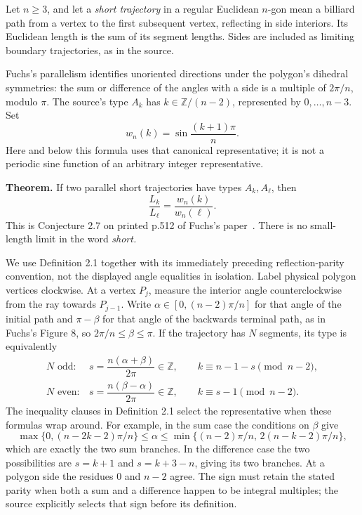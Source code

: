 \documentclass[11pt]{article}
\begin{document}
Let \(n\ge3\), and let a \emph{short trajectory} in a regular Euclidean \(n\)-gon mean a billiard path from a vertex to the first subsequent vertex, reflecting in side interiors. Its Euclidean length is the sum of its segment lengths. Sides are included as limiting boundary trajectories, as in the source.

Fuchs's parallelism identifies unoriented directions under the polygon's dihedral symmetries: the sum or difference of the angles with a side is a multiple of \(2\pi/n\), modulo \(\pi\). The source's type \(A_k\) has \(k\in\mathbb Z/(n-2)\), represented by \(0,\ldots,n-3\). Set
\[
w_n(k)=\sin\frac{(k+1)\pi}{n}.
\]
Here and below this formula uses that canonical representative; it is not a periodic sine function of an arbitrary integer representative.

\textbf{Theorem.} If two parallel short trajectories have types \(A_k,A_\ell\), then
\[
\frac{L_k}{L_\ell}=\frac{w_n(k)}{w_n(\ell)}.
\tag{1}
\]
This is Conjecture 2.7 on printed p.512 of Fuchs's paper~\cite{Fuchs}. There is no small-length limit in the word \emph{short.}

We use Definition 2.1 together with its immediately preceding reflection-parity convention, not the displayed angle equalities in isolation. Label physical polygon vertices clockwise. At a vertex \(P_j\), measure the interior angle counterclockwise from the ray towards \(P_{j-1}\). Write \(\alpha\in[0,(n-2)\pi/n]\) for that angle of the initial path and \(\pi-\beta\) for that angle of the backwards terminal path, as in Fuchs's Figure 8, so \(2\pi/n\le\beta\le\pi\). If the trajectory has \(N\) segments, its type is equivalently
\[
\begin{array}{ll}
N\text{ odd}:&
s=\dfrac{n(\alpha+\beta)}{2\pi}\in\mathbb Z,\qquad k\equiv n-1-s\pmod{n-2},\\[4pt]
N\text{ even}:&
s=\dfrac{n(\beta-\alpha)}{2\pi}\in\mathbb Z,\qquad k\equiv s-1\pmod{n-2}.
\end{array}
\tag{2}
\]
The inequality clauses in Definition 2.1 select the representative when these formulas wrap around. For example, in the sum case the conditions on \(\beta\) give
\[
\max\{0,(n-2k-2)\pi/n\}\le\alpha
\le\min\{(n-2)\pi/n,\,2(n-k-2)\pi/n\},
\]
which are exactly the two sum branches. In the difference case the two possibilities are \(s=k+1\) and \(s=k+3-n\), giving its two branches. At a polygon side the residues \(0\) and \(n-2\) agree. The sign must retain the stated parity when both a sum and a difference happen to be integral multiples; the source explicitly selects that sign before its definition.
\end{document}
